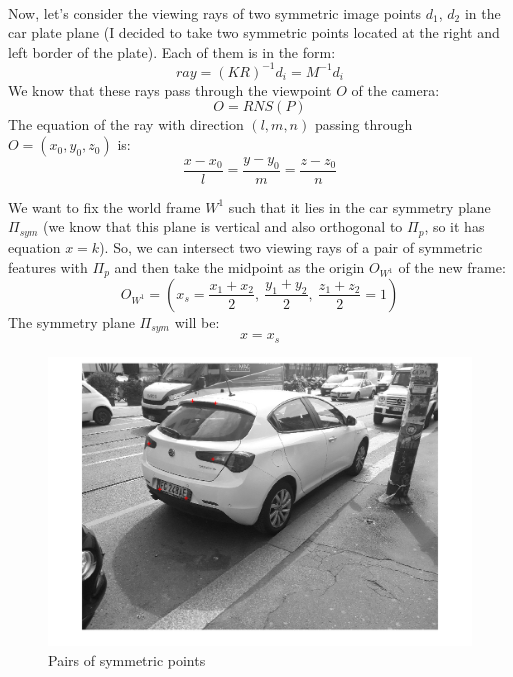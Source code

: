 \documentclass{article}
\begin{document}
\\
Now, let's consider the viewing rays of two symmetric image points $d_1$, $d_2$ in the car plate plane (I decided to take two symmetric points located at the right and left border of the plate). Each of them is in the form:
$$ ray = (KR)^{-1}d_i = M^{-1}d_i $$
We know that these rays pass through the viewpoint $O$ of the camera:
$$ O = RNS(P) $$
The equation of the ray with direction $(l, m, n)$ passing through $O = (x_0, y_0, z_0)$ is:
$$ \frac{x-x_0}{l} = \frac{y-y_0}{m} = \frac{z-z_0}{n} $$

We want to fix the world frame $W^1$ such that it lies in the car symmetry plane $\Pi_{sym}$ (we know that this plane is vertical and also orthogonal to $\Pi_p$, so it has equation $x=k$). So, we can intersect two viewing rays of a pair of symmetric features with $\Pi_{p}$ and then take the midpoint as the origin $O_{W^1}$ of the new frame:
$$ O_{W^1} = ( x_s = \frac{x_1+x_2}{2}, \: \frac{y_1+y_2}{2}, \: \frac{z_1+z_2}{2}=1 ) $$
The symmetry plane $\Pi_{sym}$ will be:
$$ x=x_s $$

\begin{figure}[h!]
\centering
\includegraphics[scale=0.35]{images/homework_14.png}
\caption{Pairs of symmetric points}
\label{fig:symmetricfeatures}
\end{figure}
\end{document}
